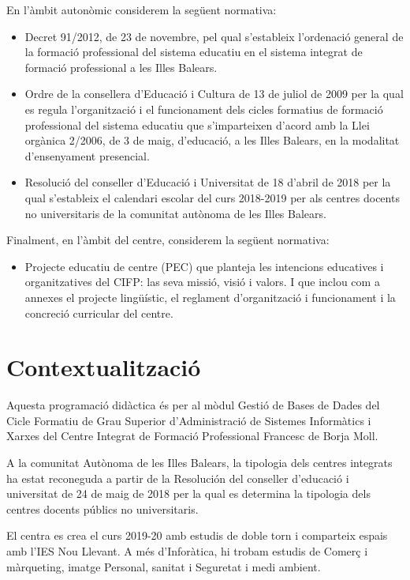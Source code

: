 \documentclass[catalan, a4paper, 12pt, titlepage]{article}
\begin{document}
En l'àmbit autonòmic considerem la següent normativa:
\begin{itemize}
	\item Decret 91/2012, de 23 de novembre, pel qual s'estableix l'ordenació general de la formació professional del sistema educatiu en el sistema integrat de formació professional a les Illes Balears.
	\item Ordre de la consellera d'Educació i Cultura de 13 de juliol de 2009 per la qual es regula l'organització i el funcionament dels cicles formatius de formació professional del sistema educatiu que s'imparteixen d'acord amb la Llei orgànica 2/2006, de 3 de maig, d'educació, a les Illes Balears, en la modalitat d'ensenyament presencial.
	\item Resolució del conseller d'Educació i Universitat de 18 d'abril de 2018 per la qual s'estableix el calendari escolar del curs 2018-2019 per als centres docents no universitaris de la comunitat autònoma de les Illes Balears.
\end{itemize}

Finalment, en l'àmbit del centre, considerem la següent normativa:
\begin{itemize}
	\item Projecte educatiu de centre (PEC) que planteja les intencions educatives i organitzatives del CIFP: las seva missió, visió i valors. I que inclou com a annexes el projecte lingüístic, el reglament d'organització i funcionament i la concreció curricular del centre.
\end{itemize}

\section{Contextualització}

Aquesta programació didàctica és per al mòdul Gestió de Bases de Dades del Cicle Formatiu de Grau Superior d'Administració de Sistemes Informàtics i Xarxes del Centre Integrat de Formació Professional Francesc de Borja Moll. 

A la comunitat Autònoma de les Illes Balears, la tipologia dels centres integrats ha estat reconeguda a partir de la Resolución del conseller d'educació i universitat de 24 de maig de 2018 per la qual es determina la tipologia dels centres docents públics no universitaris.

El centra es crea el curs 2019-20 amb estudis de doble torn i comparteix espais amb l'IES Nou Llevant. A més d'Inforàtica, hi trobam estudis de Comerç i màrqueting, imatge Personal, sanitat i Seguretat i medi ambient.
\end{document}
